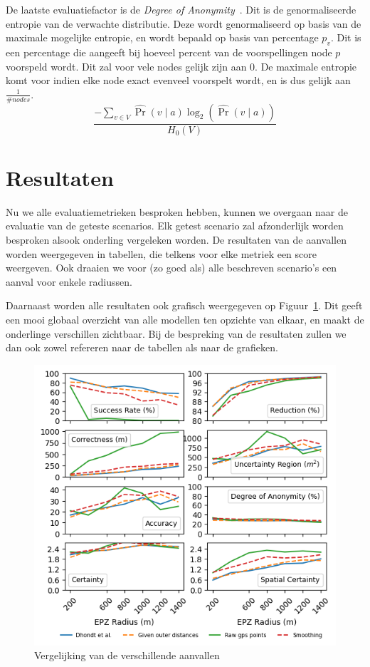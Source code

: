 De laatste evaluatiefactor is de \textit{Degree of
    Anonymity}~\cite{Dhondt,Verdonck_2022}. Dit is de genormaliseerde entropie van
de verwachte distributie. Deze wordt genormaliseerd op basis van de maximale
mogelijke entropie, en wordt bepaald op basis van percentage $p_v$. Dit is een
percentage die aangeeft bij hoeveel percent van de voorspellingen node $p$
voorspeld wordt. Dit zal voor vele nodes gelijk zijn aan 0. De maximale
entropie komt voor indien elke node exact evenveel voorspelt wordt, en is dus
gelijk aan $\frac{1}{\# nodes}$.
\begin{equation}
    \frac{-\sum_{v \in V} \widehat{\operatorname{Pr}}(v \mid a) \log _2(\widehat{\operatorname{Pr}}(v \mid a))}{H_0(V)}\label{eq:degree_of_anonymity}
\end{equation}

\section{Resultaten}
Nu we alle evaluatiemetrieken besproken hebben, kunnen we overgaan naar de
evaluatie van de geteste scenarios. Elk getest scenario zal afzonderlijk worden
besproken alsook onderling vergeleken worden. De resultaten van de aanvallen
worden weergegeven in tabellen, die telkens voor elke metriek een score
weergeven. Ook draaien we voor (zo goed als) alle beschreven scenario's een
aanval voor enkele radiussen.

Daarnaast worden alle resultaten ook grafisch weergegeven op
Figuur~\ref{fig:attack_comparison}. Dit geeft een mooi globaal overzicht van
alle modellen ten opzichte van elkaar, en maakt de onderlinge verschillen
zichtbaar. Bij de bespreking van de resultaten zullen we dan ook zowel
refereren naar de tabellen als naar de grafieken.

\begin{figure}[h]
    \centering
    \includegraphics[width=\textwidth]{fig/result_graphs/all_results.png}
    \caption{Vergelijking van de verschillende aanvallen}\label{fig:attack_comparison}
\end{figure}

